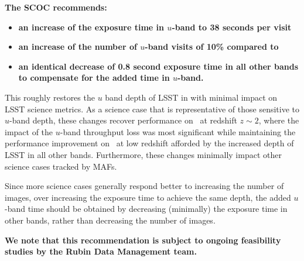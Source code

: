 {\bf The SCOC recommends:} 

\begin{itemize} 
\item {\bf an increase of the exposure time in $u$-band to 38 seconds per visit}
\item {\bf an increase of the number of $u$-band visits of 10\% compared to }
\item {\bf an identical decrease of 0.8 second exposure time in all other bands to compensate for the added time in $u$-band.} 
\end{itemize}


This roughly restores the $u$ band depth of LSST in  with minimal impact on LSST science metrics. As a science case that is representative of those sensitive to $u$-band depth, these changes recover performance on \pz\ at redshift $z\sim2$, where the impact of the $u$-band throughput loss was most significant while maintaining the performance improvement on \pz\ at low redshift afforded by the increased depth of LSST in all other bands. Furthermore, these changes minimally impact other science cases tracked by MAFs. 

Since more science cases generally respond better to increasing the number of images, over increasing the exposure time to achieve the same depth, the added $u$-band time should be obtained by decreasing (minimally) the exposure time in other bands, rather than decreasing the number of images.

\textbf{ We note that this recommendation is subject to ongoing feasibility studies by the Rubin Data 
Management team.}

